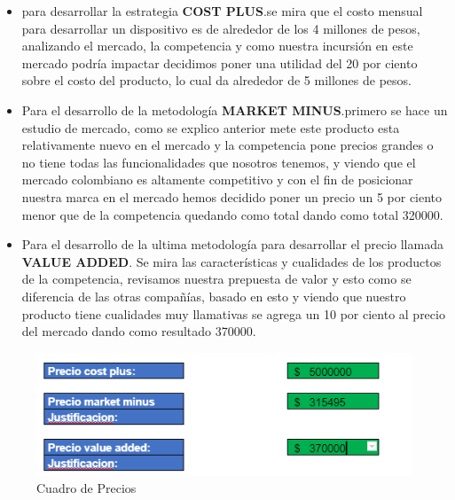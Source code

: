 \documentclass[conference,compsoc,onecolumn]{IEEEtran}
\begin{document}
\begin{itemize}
    \item para desarrollar la estrategia \textbf{COST PLUS}.\bigskip se mira que el costo mensual para desarrollar un dispositivo es de alrededor de los 4 millones de pesos, analizando el mercado, la competencia y como nuestra incursión en este mercado podría impactar decidimos poner una utilidad del 20 por ciento sobre el costo del producto, lo cual da alrededor de 5 millones de pesos.
    
    \item Para el desarrollo de la metodología \textbf{MARKET MINUS}.\bigskip  primero se hace un estudio de mercado, como se explico anterior mete este producto esta relativamente nuevo en el mercado y la competencia pone precios grandes o no tiene todas las funcionalidades que nosotros tenemos, y viendo que el mercado colombiano es altamente competitivo y con el fin de posicionar nuestra marca en el mercado hemos decidido poner un precio un 5 por ciento menor que de la competencia quedando como total dando como total 320000.
    
    \item Para el desarrollo de la ultima metodología para desarrollar el precio llamada \textbf{VALUE ADDED}. Se mira las características y cualidades de los productos de la competencia, revisamos nuestra prepuesta de valor y esto como se diferencia de las otras compañías, basado en esto y viendo que nuestro producto tiene cualidades muy llamativas se agrega un 10 por ciento al precio del mercado dando como resultado 370000.
\end{itemize}


\begin{figure}[H]
    \centering
    \includegraphics[scale = 0.9]{imagenes/precios.PNG}
    \caption{Cuadro de Precios}
    \label{fig:my_label}
\end{figure}





\label{sec:conclusions}




\nocite{*}

\end{document}
